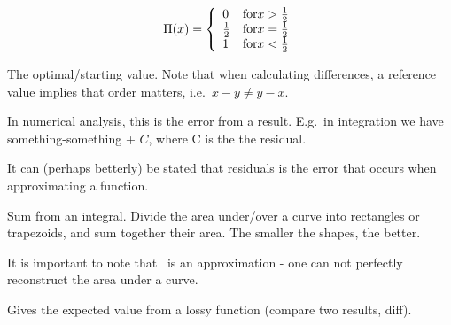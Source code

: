 \begin{definition}
    $$
    \Pi(x) = \left\{
            \begin{array}{l l}
                0 & \text{for} x > \frac{1}{2} \\
                \frac{1}{2} & \text{for} x = \frac{1}{2} \\
                1 & \text{for} x < \frac{1}{2} \\
            \end{array}
        \right.
    $$
\end{definition}

\begin{definition}
    The optimal/starting value. Note that when calculating differences,
    a reference value implies that order matters, i.e.\ $x - y \neq y - x$.

\end{definition}

\begin{definition}[Residual]
    In numerical analysis, this is the error from a result.
    E.g.\ in integration we have something-something + $C$, where C is the 
    the residual.

    It can (perhaps betterly) be stated that residuals is the error that occurs
    when approximating a function.

\end{definition}

\begin{definition}\label{riemannsum}
    Sum from an integral. Divide the area under/over a curve into rectangles
    or trapezoids, and sum together their area. The smaller the shapes, the
    better.

    It is important to note that~ is an approximation - 
    one can not perfectly reconstruct the area under a curve.
\end{definition}

\begin{definition}
    Gives the expected value from a lossy function (compare two results, diff).
\end{definition}

